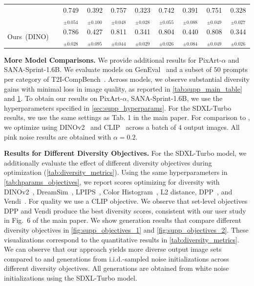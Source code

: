 \documentclass[10pt,twocolumn,letterpaper]{article}
\newcommand{\ours}{Ours}
\newcommand{\pfat}{\contour{black}{\textcolor{softpink}{\textbf{\textsf{p}}}}}
\begin{document}
\begin{table}[h]
{\begin{tabular}{lccccc|cccc}
  \citet{gi} %
  & \pfat & 0.749$_{\pm 0.054}$ & 0.392$_{\pm 0.100}$ & 0.757$_{\pm 0.048}$ & 0.323$_{\pm 0.028}$   &  0.742$_{\pm 0.055}$ & 0.391$_{\pm 0.088}$ & 0.751$_{\pm 0.049}$ & 0.328$_{\pm 0.027}$ \\
  
    \ours\ (DINO) & \pfat &  
    0.786$_{\pm 0.028}$ & 0.427$_{\pm 0.095}$ & 0.811$_{\pm 0.044}$ & 0.341$_{\pm 0.029}$
   &0.804$_{\pm 0.026}$ & 0.440$_{\pm 0.084}$ & 0.808$_{\pm 0.049}$ & 0.344$_{\pm 0.026}$   \\
  \bottomrule
  \bottomrule

\end{tabular}%
}

\label{tab:supp_pink_table}
\end{table}

\textbf{More Model Comparisons.} We provide additional results for PixArt-$\alpha$ and SANA-Sprint-1.6B. We evaluate models on GenEval~\cite{ghosh2023geneval} and a subset of $50$ prompts per category of T2I-CompBench~\cite{huang2023t2icompbench}. Across models, we observe substantial diversity gains with minimal loss in image quality, as reported in \cref{tab:supp_main_table} and \cref{tab:supp_pink_table}. To obtain our results on PixArt-$\alpha$, SANA-Sprint-1.6B, we use the hyperparameters specified in \cref{sec:supp_hyperparams}. For the SDXL-Turbo results, we use the same settings as Tab. 1 in the main paper. For comparison to \cite{gi}, we optimize using DINOv2~\cite{dinov2} and CLIP~\cite{clip} across a batch of $4$ output images. All pink noise results are obtained with $\alpha=0.2$.

\noindent \textbf{Results for Different Diversity Objectives.} For the SDXL-Turbo model, we additionally evaluate the effect of different diversity objectives during optimization (\cref{tab:diversity_metrics}). Using the same hyperparameters in \cref{tab:hparams_objectives}, we report scores optimizing for diversity with DINOv2~\cite{dinov2}, DreamSim~\cite{fu2023dreamsim}, LPIPS~\cite{lpips}, Color Histogram~\cite{torralba200880}, L2 distance, DPP~\cite{elfeki2019gdpp}, and Vendi~\cite{friedman2022vendi}. For quality we use a CLIP objective. We observe that set-level objectives DPP and Vendi produce the best diversity scores, consistent with our user study in Fig.~6 of the main paper.
We show generation results that compare different diversity objectives in \cref{fig:supp_objectives_1} and \cref{fig:supp_objectives_2}. These visualizations correspond to the quantitative results in \cref{tab:diversity_metrics}. We can observe that our approach yields more diverse output image sets compared to \cite{gi} and generations from $\text{i.i.d.}$-sampled noise initializations across different diversity objectives. All generations are obtained from white noise initializations using the SDXL-Turbo model.
\end{document}
